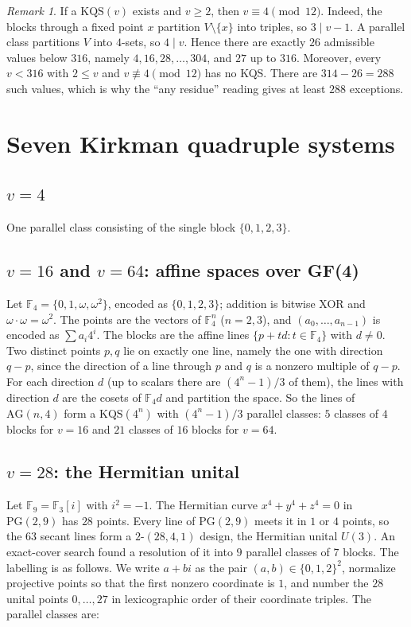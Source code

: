 \documentclass[11pt]{article}
\theoremstyle{definition}
\theoremstyle{remark}
\newtheorem{remark}[theorem]{Remark}
\begin{document}
\begin{remark}\label{rem:nec}
If a $\mathrm{KQS}(v)$ exists and $v\ge2$, then $v\equiv4\pmod{12}$. Indeed, the blocks through a
fixed point $x$ partition $V\setminus\{x\}$ into triples, so $3\mid v-1$. A parallel class
partitions $V$ into $4$-sets, so $4\mid v$. Hence there are exactly $26$ admissible values
below $316$, namely $4,16,28,\dots,304$, and $27$ up to $316$. Moreover, every $v<316$ with
$2\le v$ and $v\not\equiv4\pmod{12}$ has no KQS. There are $314-26=288$ such values, which is
why the ``any residue'' reading gives at least $288$ exceptions.
\end{remark}

\section{Seven Kirkman quadruple systems}
\label{sec:constr}

\subsection{\texorpdfstring{$v=4$}{v=4}} One parallel class consisting of the single block
$\{0,1,2,3\}$.

\subsection{\texorpdfstring{$v=16$ and $v=64$}{v=16 and v=64}: affine spaces over GF(4)}
Let $\mathbb F_4=\{0,1,\omega,\omega^2\}$, encoded as $\{0,1,2,3\}$; addition is bitwise XOR and
$\omega\cdot\omega=\omega^2$. The points are the vectors of $\mathbb F_4^n$ ($n=2,3$),
and $(a_0,\dots,a_{n-1})$ is encoded as $\sum a_i4^i$. The blocks are the affine lines
$\{p+td:t\in\mathbb F_4\}$ with $d\neq0$. Two distinct points $p,q$ lie on exactly one line,
namely the one with direction $q-p$, since the direction of a line through $p$ and $q$ is a
nonzero multiple of $q-p$. For each direction $d$ (up to scalars there are $(4^n-1)/3$ of them),
the lines with direction $d$ are the cosets of $\mathbb F_4d$ and partition the space. So the
lines of $\mathrm{AG}(n,4)$ form a $\mathrm{KQS}(4^n)$ with $(4^n-1)/3$ parallel classes:
$5$ classes of $4$ blocks for $v=16$ and $21$ classes of $16$ blocks for $v=64$.

\subsection{\texorpdfstring{$v=28$}{v=28}: the Hermitian unital}
Let $\mathbb F_9=\mathbb F_3[i]$ with $i^2=-1$. The Hermitian curve $x^4+y^4+z^4=0$ in
$\mathrm{PG}(2,9)$ has $28$ points. Every line of $\mathrm{PG}(2,9)$ meets it in $1$ or $4$
points, so the $63$ secant lines form a $2$-$(28,4,1)$ design, the Hermitian unital $U(3)$.
An exact-cover search found a resolution of it into $9$ parallel classes of $7$ blocks.
The labelling is as follows. We write $a+bi$ as the pair $(a,b)\in\{0,1,2\}^2$, normalize
projective points so that the first nonzero coordinate is $1$, and number the $28$ unital
points $0,\dots,27$ in lexicographic order of their coordinate triples. The parallel classes are:
\end{document}
